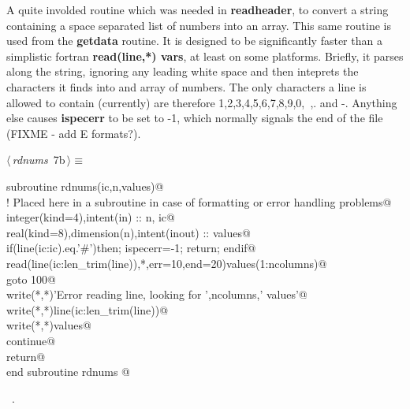 \documentclass[10pt,a4paper,notitlepage]{article}
\newcommand{\var}[1]{\textbf{\textsf{#1}}} %
\newcommand{\code}[1]{\textbf{\textsf{#1}}} %
\begin{document}
A quite involded routine which was needed in \code{readheader}, to convert a 
string containing a space separated list of numbers into an array.
This same routine is used from the \code{getdata} routine.
It is designed to be significantly faster than a simplistic
fortran \code{read(line,*) vars}, at least on some platforms. 
Briefly, it parses along the string, ignoring any leading white space and then
inteprets the characters it finds into and array of numbers.
The only characters a line is allowed to contain (currently) are therefore
1,2,3,4,5,6,7,8,9,0,\verb*+ +,. and -. 
Anything else causes \var{ispecerr} to be set to -1, which normally signals the
end of the file (FIXME - add E formats?).


\begin{flushleft} \small
\begin{minipage}{\linewidth}\label{scrap6}\raggedright\small
{} $\langle\,${\it rdnums}\nobreak\ {\footnotesize {7b}}$\,\rangle\equiv$
\vspace{-1ex}
\begin{list}{}{} \item
\mbox{}\verb@      subroutine rdnums(ic,n,values)@\\
\mbox{}\verb@! Placed here in a subroutine in case of formatting or error handling problems@\\
\mbox{}\verb@      integer(kind=4),intent(in) :: n, ic@\\
\mbox{}\verb@      real(kind=8),dimension(n),intent(inout) :: values@\\
\mbox{}\verb@      if(line(ic:ic).eq.'#')then; ispecerr=-1; return; endif@\\
\mbox{}\verb@      read(line(ic:len_trim(line)),*,err=10,end=20)values(1:ncolumns)@\\
\mbox{}\verb@      goto 100@\\
\mbox{}    write(*,*)'Error reading line, looking for ',ncolumns,' values'@\\
\mbox{}\verb@      write(*,*)line(ic:len_trim(line))@\\
\mbox{}\verb@      write(*,*)values@\\
\mbox{}    continue@\\
\mbox{}   return@\\
\mbox{}\verb@      end subroutine rdnums  @{\NWsep}
\end{list}
\vspace{-1.5ex}
\footnotesize
\begin{list}{}{\setlength{\itemsep}{-\parsep}\setlength{\itemindent}{-\leftmargin}}
\item \NWtxtMacroRefIn\ .

\item{}
\end{list}
\end{minipage}\vspace{4ex}
\end{flushleft}
\end{document}
